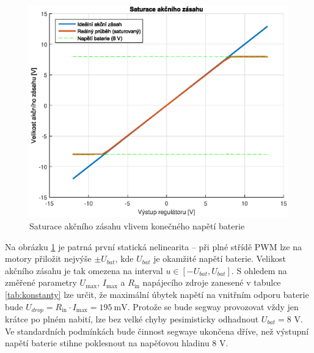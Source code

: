 \documentclass[conference]{IEEEtran}
\begin{document}
\begin{figure}[htbp]
    \centerline{\includegraphics[width=\linewidth]{pwm_saturace.eps}}
    \caption{Saturace akčního zásahu vlivem konečného napětí baterie}
    \label{fig:pwm_saturace}        
\end{figure}

Na obrázku \ref{fig:pwm_saturace} je patrná první statická nelinearita -- při plné střídě PWM lze na motory přiložit nejvýše $\pm U_{bat}$,
kde $U_{bat}$ je okamžité napětí baterie. Velikost akčního zásahu je tak omezena na interval $u \in [-U_{bat}, U_{bat}]$.
S ohledem na změřené parametry $U_\text{max}$, $I_\text{max}$ a $R_\text{in}$ napájecího zdroje zanesené v tabulce \ref{tab:konstanty} lze určit,
že maximální úbytek napětí na vnitřním odporu baterie bude $U_{drop} = R_\text{in} \cdot I_\text{max} = 195~\si{\milli\volt}$.
Protože se bude segway provozovat vždy jen krátce po plném nabití, lze bez velké chyby pesimisticky odhadnout $U_{bat} = 8$ \si{V}.
Ve standardních podmínkách bude činnost segwaye ukončena dříve, než výstupní napětí baterie stihne poklesnout na napěťovou hladinu 8 \si{V}.
\end{document}
